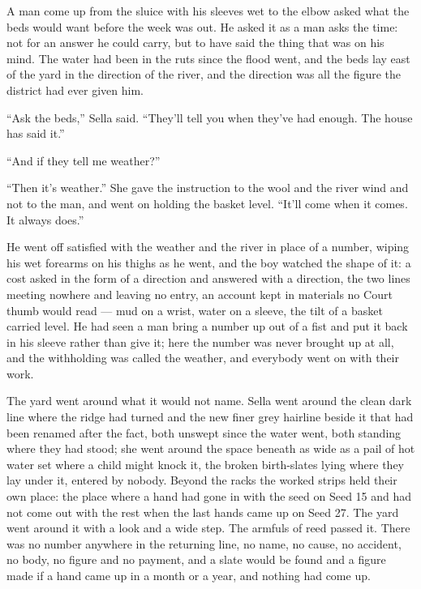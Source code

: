 A man come up from the sluice with his sleeves wet to the elbow asked what the beds would want before the week was out. He asked it as a man asks the time: not for an answer he could carry, but to have said the thing that was on his mind. The water had been in the ruts since the flood went, and the beds lay east of the yard in the direction of the river, and the direction was all the figure the district had ever given him.

“Ask the beds,” Sella said. “They'll tell you when they've had enough. The house has said it.”

“And if they tell me weather?”

“Then it's weather.” She gave the instruction to the wool and the river wind and not to the man, and went on holding the basket level. “It'll come when it comes. It always does.”

He went off satisfied with the weather and the river in place of a number, wiping his wet forearms on his thighs as he went, and the boy watched the shape of it: a cost asked in the form of a direction and answered with a direction, the two lines meeting nowhere and leaving no entry, an account kept in materials no Court thumb would read --- mud on a wrist, water on a sleeve, the tilt of a basket carried level. He had seen a man bring a number up out of a fist and put it back in his sleeve rather than give it; here the number was never brought up at all, and the withholding was called the weather, and everybody went on with their work.

\scenebreak

The yard went around what it would not name. Sella went around the clean dark line where the  ridge had turned and the new finer grey hairline beside it that had been renamed  after the fact, both unswept since the water went, both standing where they had stood; she went around the space beneath  as wide as a pail of hot water set where a child might knock it, the broken birth-slates lying where they lay under it, entered by nobody. Beyond the racks the worked strips held their own place: the place where a hand had gone in with the seed on Seed 15 and had not come out with the rest when the last hands came up on Seed 27. The yard went around it with a look and a wide step. The armfuls of reed passed it. There was no number anywhere in the returning line, no name, no cause, no accident, no body, no figure and no payment, and a slate would be found and a figure made if a hand came up in a month or a year, and nothing had come up.

